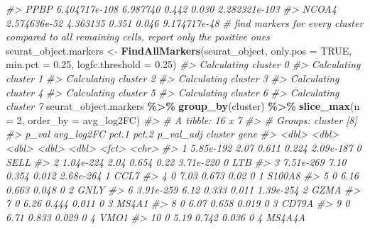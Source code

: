 \documentclass[
]{book}
\newenvironment{Shaded}{\begin{snugshade}}{\end{snugshade}}
\newcommand{\AttributeTok}[1]{\textcolor[rgb]{0.13,0.29,0.53}{#1}}
\newcommand{\CommentTok}[1]{\textcolor[rgb]{0.56,0.35,0.01}{\textit{#1}}}
\newcommand{\ConstantTok}[1]{\textcolor[rgb]{0.56,0.35,0.01}{#1}}
\newcommand{\DecValTok}[1]{\textcolor[rgb]{0.00,0.00,0.81}{#1}}
\newcommand{\FloatTok}[1]{\textcolor[rgb]{0.00,0.00,0.81}{#1}}
\newcommand{\FunctionTok}[1]{\textcolor[rgb]{0.13,0.29,0.53}{\textbf{#1}}}
\newcommand{\NormalTok}[1]{#1}
\newcommand{\OtherTok}[1]{\textcolor[rgb]{0.56,0.35,0.01}{#1}}
\newcommand{\SpecialCharTok}[1]{\textcolor[rgb]{0.81,0.36,0.00}{\textbf{#1}}}
\begin{document}
\begin{Shaded}
\begin{Highlighting}[]
\CommentTok{\#\textgreater{} PPBP  6.404717e{-}108   6.987740 0.442 0.030 2.282321e{-}103}
\CommentTok{\#\textgreater{} NCOA4  2.574636e{-}52   4.363135 0.351 0.046  9.174717e{-}48}
\CommentTok{\# find markers for every cluster compared to all remaining cells, report only the positive ones}
\NormalTok{seurat\_object.markers }\OtherTok{\textless{}{-}} \FunctionTok{FindAllMarkers}\NormalTok{(seurat\_object, }\AttributeTok{only.pos =} \ConstantTok{TRUE}\NormalTok{, }\AttributeTok{min.pct =} \FloatTok{0.25}\NormalTok{, }\AttributeTok{logfc.threshold =} \FloatTok{0.25}\NormalTok{)}
\CommentTok{\#\textgreater{} Calculating cluster 0}
\CommentTok{\#\textgreater{} Calculating cluster 1}
\CommentTok{\#\textgreater{} Calculating cluster 2}
\CommentTok{\#\textgreater{} Calculating cluster 3}
\CommentTok{\#\textgreater{} Calculating cluster 4}
\CommentTok{\#\textgreater{} Calculating cluster 5}
\CommentTok{\#\textgreater{} Calculating cluster 6}
\CommentTok{\#\textgreater{} Calculating cluster 7}
\NormalTok{seurat\_object.markers }\SpecialCharTok{\%\textgreater{}\%} \FunctionTok{group\_by}\NormalTok{(cluster) }\SpecialCharTok{\%\textgreater{}\%} \FunctionTok{slice\_max}\NormalTok{(}\AttributeTok{n =} \DecValTok{2}\NormalTok{, }\AttributeTok{order\_by =}\NormalTok{ avg\_log2FC)}
\CommentTok{\#\textgreater{} \# A tibble: 16 x 7}
\CommentTok{\#\textgreater{} \# Groups:   cluster [8]}
\CommentTok{\#\textgreater{}        p\_val avg\_log2FC pct.1 pct.2 p\_val\_adj cluster gene  }
\CommentTok{\#\textgreater{}        \textless{}dbl\textgreater{}      \textless{}dbl\textgreater{} \textless{}dbl\textgreater{} \textless{}dbl\textgreater{}     \textless{}dbl\textgreater{} \textless{}fct\textgreater{}   \textless{}chr\textgreater{} }
\CommentTok{\#\textgreater{}  1 5.85e{-}192       2.07 0.611 0.224 2.09e{-}187 0       SELL  }
\CommentTok{\#\textgreater{}  2 1.04e{-}224       2.04 0.654 0.22  3.71e{-}220 0       LTB   }
\CommentTok{\#\textgreater{}  3 7.51e{-}269       7.10 0.354 0.012 2.68e{-}264 1       CCL7  }
\CommentTok{\#\textgreater{}  4 0               7.03 0.673 0.02  0         1       S100A8}
\CommentTok{\#\textgreater{}  5 0               6.16 0.663 0.048 0         2       GNLY  }
\CommentTok{\#\textgreater{}  6 3.91e{-}259       6.12 0.333 0.011 1.39e{-}254 2       GZMA  }
\CommentTok{\#\textgreater{}  7 0               6.26 0.444 0.011 0         3       MS4A1 }
\CommentTok{\#\textgreater{}  8 0               6.07 0.658 0.019 0         3       CD79A }
\CommentTok{\#\textgreater{}  9 0               6.71 0.833 0.029 0         4       VMO1  }
\CommentTok{\#\textgreater{} 10 0               5.19 0.742 0.036 0         4       MS4A4A}

\end{Highlighting}
\end{Shaded}
\end{document}
